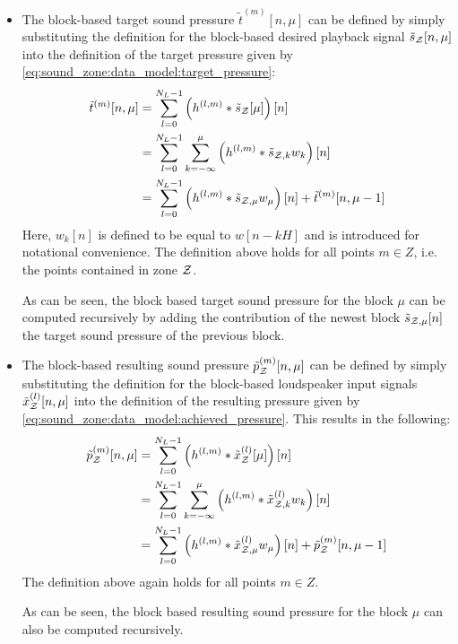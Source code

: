 \begin{itemize}
    \item 
        The block-based target sound pressure $\tilde{t}^{(m)}[n, \mu]$ can be defined by simply 
        substituting the definition for the block-based desired playback signal $\tilde{s}_{\mathcal{Z}}[n, \mu]$ into the definition of the 
        target pressure given by \autoref{eq:sound_zone:data_model:target_pressure}:
        \begin{equation}
            \begin{aligned}
                \tilde{t}^{(m)}[n, \mu] &= \sum_{l=0}^{N_L-1} \left(h^{(l,m)} \ast \tilde{s}_{\mathcal{Z}}[\mu]\right)[n]\\
                                        &= \sum_{l=0}^{N_L - 1}\sum_{k=-\infty}^{\mu}\left(h^{(l,m)}\ast\tilde{s}_{\mathcal{Z},k}w_k\right)[n] \\
                                   &= \sum_{l=0}^{N_L-1}\left(h^{(l,m)}\ast\tilde{s}_{\mathcal{Z},\mu}w_\mu\right)[n] + \tilde{t}^{(m)}[n, \mu - 1]  
            \end{aligned}
        \end{equation}
        Here, $w_k[n]$ is defined to be equal to $w[n - kH]$ and is introduced for notational convenience.  
        The definition above holds for all points $m\in Z$, i.e. the points contained in zone $\mathcal{Z}$.  

        As can be seen, the block based target sound pressure for the block $\mu$ can be computed recursively by adding the contribution of the newest block 
        $\tilde{s}_{\mathcal{Z},\mu}[n]$ the target sound pressure of the previous block.
    \item 
        The block-based resulting sound pressure $\tilde{p}_{\mathcal{Z}}^{(m)}[n, \mu]$ can be defined by simply 
        substituting the definition for the block-based loudspeaker input signals $\tilde{x}_{\mathcal{Z}}^{(l)}[n, \mu]$ into the definition 
        of the resulting pressure given by \autoref{eq:sound_zone:data_model:achieved_pressure}.
        This results in the following: 
        \begin{equation}
            \begin{aligned}
                \tilde{p}_{\mathcal{Z}}^{(m)}[n, \mu] &= \sum_{l=0}^{N_L-1}                       \left(h^{(l,m)} \ast \tilde{x}^{(l)}_{\mathcal{Z}}[\mu]\right)[n]\\
                                            &= \sum_{l=0}^{N_L-1}\sum_{k=-\infty}^{\mu} \left(h^{(l,m)} \ast \tilde{x}^{(l)}_{\mathcal{Z},k}w_k\right)[n] \\
                                            &= \sum_{l=0}^{N_L-1}                       \left(h^{(l,m)} \ast \tilde{x}^{(l)}_{\mathcal{Z},\mu}w_\mu\right)[n] +
                                                \tilde{p}_{\mathcal{Z}}^{(m)}[n, \mu - 1]  
            \end{aligned}
            \label{eq:perceptual_sound_zones:stft:block_based:achieved_pressure}
        \end{equation}
        The definition above again holds for all points $m\in Z$.  

        As can be seen, the block based resulting sound pressure for the block $\mu$ can also be computed recursively.
\end{itemize}

